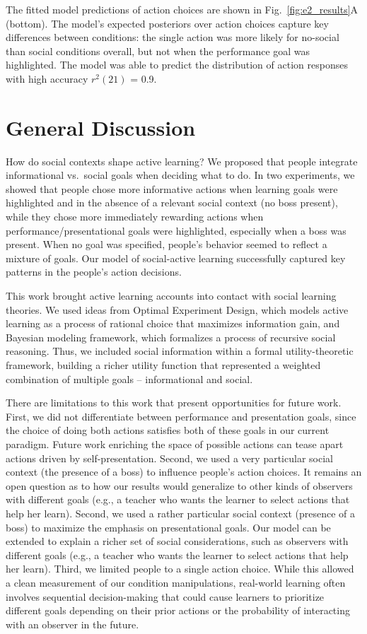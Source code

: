 \documentclass[10pt, letterpaper]{article}
\begin{document}
The fitted model predictions of action choices are shown in
Fig.~\ref{fig:e2_results}A (bottom). The model's expected posteriors
over action choices capture key differences between conditions: the
single action was more likely for no-social than social conditions
overall, but not when the performance goal was highlighted. The model
was able to predict the distribution of action responses with high
accuracy \(r^2(21)\) = 0.9.

\section{General Discussion}\label{general-discussion}

How do social contexts shape active learning? We proposed that people
integrate informational vs.~social goals when deciding what to do. In
two experiments, we showed that people chose more informative actions
when learning goals were highlighted and in the absence of a relevant
social context (no boss present), while they chose more immediately
rewarding actions when performance/presentational goals were
highlighted, especially when a boss was present. When no goal was
specified, people's behavior seemed to reflect a mixture of goals. Our
model of social-active learning successfully captured key patterns in
the people's action decisions.

This work brought active learning accounts into contact with social
learning theories. We used ideas from Optimal Experiment Design, which
models active learning as a process of rational choice that maximizes
information gain, and Bayesian modeling framework, which formalizes a
process of recursive social reasoning. Thus, we included social
information within a formal utility-theoretic framework, building a
richer utility function that represented a weighted combination of
multiple goals -- informational and social.

There are limitations to this work that present opportunities for future
work. First, we did not differentiate between performance and
presentation goals, since the choice of doing both actions satisfies
both of these goals in our current paradigm. Future work enriching the
space of possible actions can tease apart actions driven by
self-presentation. Second, we used a very particular social context (the
presence of a boss) to influence people's action choices. It remains an
open question as to how our results would generalize to other kinds of
observers with different goals (e.g., a teacher who wants the learner to
select actions that help her learn). Second, we used a rather particular
social context (presence of a boss) to maximize the emphasis on
presentational goals. Our model can be extended to explain a richer set
of social considerations, such as observers with different goals (e.g.,
a teacher who wants the learner to select actions that help her learn).
Third, we limited people to a single action choice. While this allowed a
clean measurement of our condition manipulations, real-world learning
often involves sequential decision-making that could cause learners to
prioritize different goals depending on their prior actions or the
probability of interacting with an observer in the future.
\end{document}
